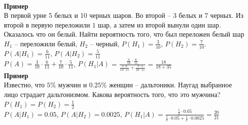 \documentclass[russian, 12pt, fleqn,x11names]{article}
\begin{document}
\\
\textbf{Пример\ }\\
В первой урне 5 белых и 10 черных шаров. Во второй -- 3 белых и 7 черных. Из второй в первую переложили $1$ шар, а затем из второй вынули один шар. Оказалось что он белый. Найти вероятность того, что был переложен белый шар\\
$H_1$ -- переложили белый, $H_2$ -- черный, $P(H_1)=\frac{3}{10}$, $P(H_2)=\frac{7}{10}$. $P(A|H_1)=\frac{6}{11}$, $P(A|H_2)=\frac{5}{11}$\\
 $P(A)=\frac{3}{10}\cdot \frac{6}{11} + \frac{7}{10} \cdot \frac{5}{11}$, $P(H_1|A)$ = $\frac {\frac{3}{10}\cdot \frac{6}{11} }   {\frac{3\cdot 6}{10\cdot11} + \frac{7\cdot5}{10\cdot11}  }$ = $\frac{18}{18 + 35}$\\
\textbf{Пример\ }\\
Известно, что $5\%$ мужчин и $0.25\%$ женщин -- дальтоники. Наугад выбранное лицо страдает дальтонизмом. Какова вероятность того, что это мужчина?\\
$P(H_1) = P(H_2) = \frac{1}{2}$\\
$P(A|H_1) = 0.05$, $P(A|H_2) = 0.0025$, $P(H_1|A) = \frac{\frac{1}{2} \cdot 0.05}{ \frac{1}{2} \cdot 0.05 + \frac{1}{2} \cdot 0.0025 } = \frac{20}{21}$\\
\end{document}
